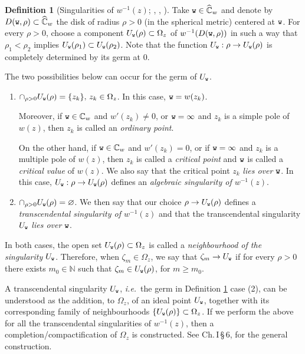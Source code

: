 \documentclass[final,3p,times]{elsarticle}
\newcommand{\CC}{\ensuremath{{\mathbb C}}}
\newcommand{\CW}{\ensuremath{{\widehat{\mathbb C}}}}
\newcommand{\NN}{\ensuremath{{\mathbb N}}}
\theoremstyle{definition}
\newtheorem{definition}[theorem]{Definition}
\begin{document}
\begin{definition}[Singularities of $w^{-1}(z)$; \cite{Iversen}, 
\cite{BergweilerEremenko},
\cite{EremenkoReview}]
\label{def:eremenko1}
Take ${\tt w}\in\CW_{w}$ and denote by 
$D({\tt w},\rho) \subset \CW_w$
the disk of radius $\rho > 0$ (in the spherical metric) 
centered at $\tt w$. 
For every 
$\rho > 0$, choose a component 
$U_{\tt w}(\rho)\subset \Omega_z $ of  
$w^{-1}(D({\tt w},\rho))$ in such a way that 
$\rho_{1} < \rho_{2}$ implies $U_{\tt w}(\rho_1) \subset U_{\tt w}(\rho_{2})$. 
Note that the function $U_{\tt w} : \rho \to U_{\tt w}(\rho)$ 
is completely determined by its germ at 0. 

\noindent
The two possibilities below can occur for the germ of $U_{\tt w}$.
\begin{enumerate}[label=\arabic*),leftmargin=*] 
\item 
$\cap_{\rho>0} U_{\tt w}(\rho)=
\{z_k \},
\, z_k\in \Omega_z $. 
In this case, ${\tt w}=w(z_k )$. 

\noindent
Moreover, if ${\tt w}\in\CC_w$ and $w'( z_k )\neq0$, 
or 
${\tt w} = \infty$ and $ z_k $ is a simple pole of $w(z)$, 
then $z_k$ is called an \emph{ordinary point}. 

\noindent
On the other hand, 
if ${\tt w}\in\CC_w$ and $w'(z_k) = 0$, 
or 
if ${\tt w} = \infty$ and $z_k$ is a multiple pole of $w(z)$, 
then $z_k$ is called a \emph{critical point} and $\tt w$ 
is called a \emph{critical value} 
of $w(z)$. 
We also say that the critical point $z_k$ \emph{lies over $\tt w$}.
In this case, 
$U_{\tt w} : \rho \to U_{\tt w}(\rho)$ defines an \emph{algebraic singularity of $w^{-1}(z)$}.

\item $\cap_{\rho>0}U_{\tt w}(\rho) = \varnothing$. 
We then say that our choice $\rho \to
U_{\tt w}(\rho)$ defines a \emph{transcendental 
singularity of $w^{-1}(z)$}
and that the transcendental singularity 
$U_{\tt w}$ \emph{lies over $\tt w$}. 
\end{enumerate}

\noindent 
In both cases, 
the open set $U_{\tt w}(\rho) \subset \Omega_z$ is called a 
\emph{neighbourhood of the  singularity $U_{\tt w}$}. 
Therefore, 
when $\zeta_{m} \in \Omega_z$, 
we say that $\zeta_{m} \to U_{\tt w}$ 
if for every $\rho>0$ 
there exists $m_{0} \in \NN$ such that 
$\zeta_{m} \in U_{\tt w}(\rho)$, for $m \geq m_{0}$.
\end{definition}

A transcendental singularity $U_{\tt w}$, \emph{i.e.}\ the
germ in Definition \ref{def:eremenko1} case (2), 
can be understood as
the addition, to $\Omega_z$, of an ideal point $U_{\tt w}$, 
together with its corresponding family of neighbourhoods 
$\{ U_{\tt w}(\rho) \} \subset \Omega_z$.
If we perform the above for all the transcendental singularities
of $w^{-1}(z)$,
then a completion/compactification of 
$\Omega_z$ is constructed. See \cite{Ahlfors-Sario} Ch.\,I\,\S\,6, for the general
construction.
\end{document}
